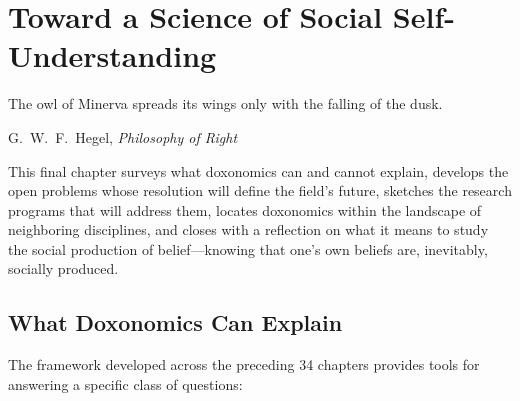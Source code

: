 \chapter{Toward a Science of Social Self-Understanding}
\label{ch:toward}

\epigraph{The owl of Minerva spreads its wings only with the falling of the dusk.}{G.\ W.\ F.\ Hegel, \textit{Philosophy of Right}}

\noindent
This final chapter surveys what doxonomics can and cannot explain, develops the open problems whose resolution will define the field's future, sketches the research programs that will address them, locates doxonomics within the landscape of neighboring disciplines, and closes with a reflection on what it means to study the social production of belief---knowing that one's own beliefs are, inevitably, socially produced.

\section{What Doxonomics Can Explain}
\label{sec:ch35-can}

The framework developed across the preceding 34 chapters provides tools for answering a specific class of questions:

